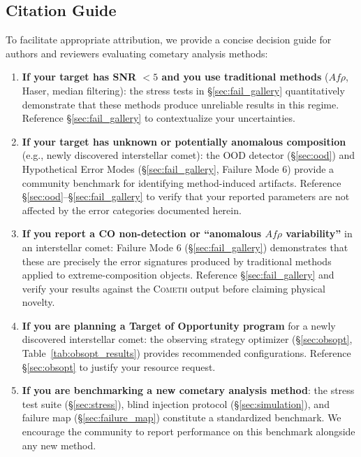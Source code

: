 \documentclass[usenatbib]{mnras}
\begin{document}
\begin{table}
\end{table}


\subsection{Citation Guide}

To facilitate appropriate attribution, we provide a concise decision guide for authors and reviewers evaluating cometary analysis methods:

\begin{enumerate}
    \item \textbf{If your target has SNR $<5$ and you use traditional methods} ($Af\rho$, Haser, median filtering): the stress tests in \S\ref{sec:fail_gallery} quantitatively demonstrate that these methods produce unreliable results in this regime. Reference \S\ref{sec:fail_gallery} to contextualize your uncertainties.
    \item \textbf{If your target has unknown or potentially anomalous composition} (e.g., newly discovered interstellar comet): the OOD detector (\S\ref{sec:ood}) and Hypothetical Error Modes (\S\ref{sec:fail_gallery}, Failure Mode 6) provide a community benchmark for identifying method-induced artifacts. Reference \S\ref{sec:ood}--\S\ref{sec:fail_gallery} to verify that your reported parameters are not affected by the error categories documented herein.
    \item \textbf{If you report a CO non-detection or ``anomalous $Af\rho$ variability''} in an interstellar comet: Failure Mode 6 (\S\ref{sec:fail_gallery}) demonstrates that these are precisely the error signatures produced by traditional methods applied to extreme-composition objects. Reference \S\ref{sec:fail_gallery} and verify your results against the \textsc{Cometh} output before claiming physical novelty.
    \item \textbf{If you are planning a Target of Opportunity program} for a newly discovered interstellar comet: the observing strategy optimizer (\S\ref{sec:obsopt}, Table~\ref{tab:obsopt_results}) provides recommended configurations. Reference \S\ref{sec:obsopt} to justify your resource request.
    \item \textbf{If you are benchmarking a new cometary analysis method}: the stress test suite (\S\ref{sec:stress}), blind injection protocol (\S\ref{sec:simulation}), and failure map (\S\ref{sec:failure_map}) constitute a standardized benchmark. We encourage the community to report performance on this benchmark alongside any new method.
\end{enumerate}
\end{document}
